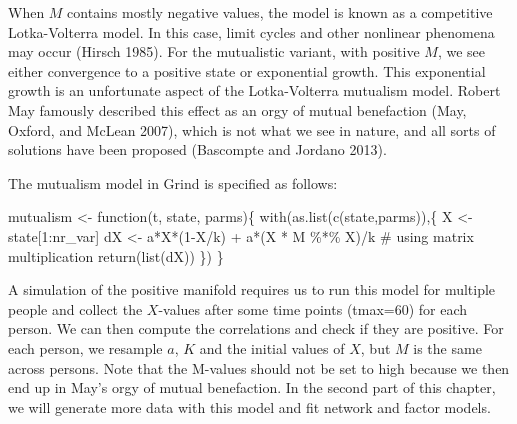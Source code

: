 \documentclass[
  a4paper,
  DIV=11,
  numbers=noendperiod]{scrreprt}
\newenvironment{Shaded}{\begin{snugshade}}{\end{snugshade}}
\newcommand{\CommentTok}[1]{\textcolor[rgb]{0.37,0.37,0.37}{#1}}
\newcommand{\ControlFlowTok}[1]{\textcolor[rgb]{0.00,0.23,0.31}{#1}}
\newcommand{\DecValTok}[1]{\textcolor[rgb]{0.68,0.00,0.00}{#1}}
\newcommand{\FunctionTok}[1]{\textcolor[rgb]{0.28,0.35,0.67}{#1}}
\newcommand{\NormalTok}[1]{\textcolor[rgb]{0.00,0.23,0.31}{#1}}
\newcommand{\OtherTok}[1]{\textcolor[rgb]{0.00,0.23,0.31}{#1}}
\newcommand{\SpecialCharTok}[1]{\textcolor[rgb]{0.37,0.37,0.37}{#1}}
\begin{document}
When \(M\) contains mostly negative values, the model is known as a
competitive Lotka-Volterra model. In this case, limit cycles and other
nonlinear phenomena may occur (Hirsch 1985). For the mutualistic
variant, with positive \(M\), we see either convergence to a positive
state or exponential growth. This exponential growth is an unfortunate
aspect of the Lotka-Volterra mutualism model. Robert May famously
described this effect as an orgy of mutual benefaction (May, Oxford, and
McLean 2007), which is not what we see in nature, and all sorts of
solutions have been proposed (Bascompte and Jordano 2013).

The mutualism model in Grind is specified as follows:

\begin{Shaded}
\begin{Highlighting}[]
\NormalTok{mutualism }\OtherTok{\textless{}{-}} \ControlFlowTok{function}\NormalTok{(t, state, parms)\{}
  \FunctionTok{with}\NormalTok{(}\FunctionTok{as.list}\NormalTok{(}\FunctionTok{c}\NormalTok{(state,parms)),\{}
\NormalTok{    X }\OtherTok{\textless{}{-}}\NormalTok{ state[}\DecValTok{1}\SpecialCharTok{:}\NormalTok{nr\_var]}
\NormalTok{    dX }\OtherTok{\textless{}{-}}\NormalTok{ a}\SpecialCharTok{*}\NormalTok{X}\SpecialCharTok{*}\NormalTok{(}\DecValTok{1}\SpecialCharTok{{-}}\NormalTok{X}\SpecialCharTok{/}\NormalTok{k) }\SpecialCharTok{+}\NormalTok{ a}\SpecialCharTok{*}\NormalTok{(X }\SpecialCharTok{*}\NormalTok{ M }\SpecialCharTok{\%*\%}\NormalTok{ X)}\SpecialCharTok{/}\NormalTok{k }\CommentTok{\# using matrix multiplication}
    \FunctionTok{return}\NormalTok{(}\FunctionTok{list}\NormalTok{(dX))}
\NormalTok{  \})}
\NormalTok{\}}
\end{Highlighting}
\end{Shaded}

A simulation of the positive manifold requires us to run this model for
multiple people and collect the \(X\)-values after some time points
(tmax=60) for each person. We can then compute the correlations and
check if they are positive. For each person, we resample \(a\), \(K\)
and the initial values of \(X\), but \(M\) is the same across persons.
Note that the M-values should not be set to high because we then end up
in May's orgy of mutual benefaction. In the second part of this chapter,
we will generate more data with this model and fit network and factor
models.
\end{document}
